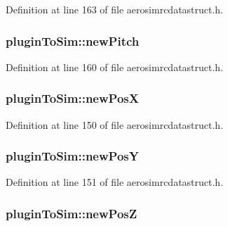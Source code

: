 Definition at line 163 of file aerosimrcdatastruct.\-h.

\hypertarget{group___aero_sim_r_c_gae5174be9526399eb834a21d1d1e996d1}{
\subsubsection[{new\-Pitch}]{ plugin\-To\-Sim\-::new\-Pitch}}\label{group___aero_sim_r_c_gae5174be9526399eb834a21d1d1e996d1}


Definition at line 160 of file aerosimrcdatastruct.\-h.

\hypertarget{group___aero_sim_r_c_ga2067141174f8fa27f36b9831b73b5668}{
\subsubsection[{new\-Pos\-X}]{ plugin\-To\-Sim\-::new\-Pos\-X}}\label{group___aero_sim_r_c_ga2067141174f8fa27f36b9831b73b5668}


Definition at line 150 of file aerosimrcdatastruct.\-h.

\hypertarget{group___aero_sim_r_c_gab0bd49c25f923d60f12c350160c63f4f}{
\subsubsection[{new\-Pos\-Y}]{ plugin\-To\-Sim\-::new\-Pos\-Y}}\label{group___aero_sim_r_c_gab0bd49c25f923d60f12c350160c63f4f}


Definition at line 151 of file aerosimrcdatastruct.\-h.

\hypertarget{group___aero_sim_r_c_ga85e01d3ec1ec3924a0482565262ccd80}{
\subsubsection[{new\-Pos\-Z}]{ plugin\-To\-Sim\-::new\-Pos\-Z}}\label{group___aero_sim_r_c_ga85e01d3ec1ec3924a0482565262ccd80}


